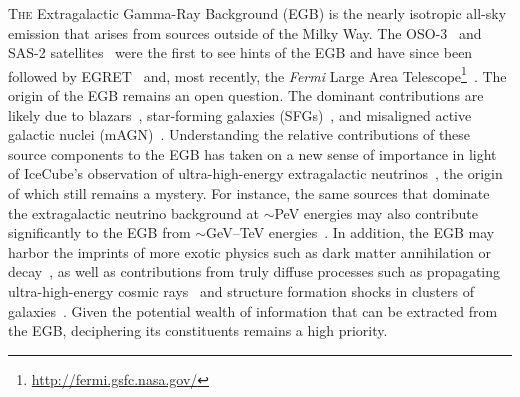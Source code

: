 \lettrine[lines=3]{T}{he} Extragalactic Gamma-Ray Background (EGB) is the nearly isotropic all-sky emission that arises from sources outside of the Milky Way.  The OSO-3~\cite{1968ApJ...153L.203C, 1972ApJ...177..341K} and SAS-2 satellites~\cite{1975ApJ...198..163F,1978ApJ...222..833F} were the first to see hints of the EGB and have since been followed by EGRET~\cite{1998ApJ...494..523S,2004ApJ...613..956S} and, most recently, the \emph{Fermi} Large Area Telescope\footnote{\url{http://fermi.gsfc.nasa.gov/}}~\cite{Ackermann:2014usa,TheFermi-LAT:2015ykq}.  The origin of the EGB remains an open question.  The dominant contributions are likely due to blazars~\cite{Stecker:1993ni, Stecker:1996ma, Muecke:1998cs, Narumoto:2006qg,Dermer:2007fg, Pavlidou:2007dv, Ajello:2009ip, Collaboration:2010gqa, Abazajian:2010pc,  Stecker:2010di,Singal:2011yi,  Ajello:2011zi, Ajello:2013lka,DiMauro:2013zfa, Ajello:2015mfa, Ackermann:2015uya}, star-forming galaxies (SFGs)~\cite{Soltan:1998jg,Pavlidou:2002va, Bhattacharya:2009yv, Ando:2009nk, Fields:2010bw, Makiya:2010zt, Ackermann:2012vca, Chakraborty:2012sh, Lacki:2012si, Tamborra:2014xia}, and misaligned active galactic nuclei (mAGN)~\cite{Stawarz:2005tq, Inoue:2011bm, Massaro:2011ww, DiMauro:2013xta, Hooper:2016gjy}.  Understanding the relative contributions of these source components to the EGB has taken on a new sense of importance in light of IceCube's observation of ultra-high-energy extragalactic neutrinos~\cite{Aartsen:2013bka,Aartsen:2013jdh,Aartsen:2015knd,Aartsen:2015rwa}, the origin of which still remains a mystery.  For instance, the same sources that dominate the extragalactic neutrino background at $\sim$PeV energies may also contribute significantly to the EGB from $\sim$GeV--TeV energies~\cite{Murase:2013rfa, Tamborra:2014xia,Hooper:2016gjy}.  In addition, the EGB may harbor the imprints of more exotic physics such as dark matter annihilation or decay~\cite{Bengtsson:1990xf,Bergstrom:2001jj,Ullio:2002pj,Bottino:2004qi,Bertone:2004pz,Bringmann:2012ez,Ajello:2015mfa, DiMauro:2015tfa, Ackermann:2015tah}, as well as contributions from truly diffuse processes such as propagating ultra-high-energy cosmic rays~\cite{Loeb:2000aa,Kalashev:2007sn,Ahlers:2011sd,Murase:2012df,Taylor:2015rla} and structure formation shocks in clusters of galaxies~\cite{Murase:2008yt,Zandanel:2014pva}.
Given the potential wealth of information that can be extracted from the EGB, deciphering its constituents remains a high priority.     

